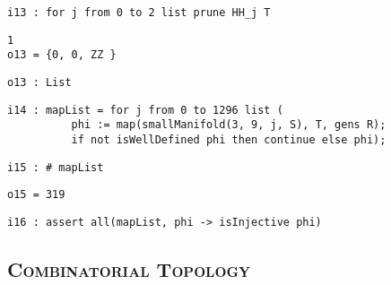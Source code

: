 \documentclass[12pt,leqno]{amsart}
\theoremstyle{definition}
\begin{document}
\begin{lstlisting}[xleftmargin=10pt, aboveskip=1.5pt, belowskip=1.5pt]
i13 : for j from 0 to 2 list prune HH_j T
\end{lstlisting}
\begin{lstlisting}[xleftmargin=10pt, lineskip=-10pt, aboveskip=4pt, belowskip=1.5pt]
               1
o13 = {0, 0, ZZ }
\end{lstlisting}
\begin{lstlisting}[xleftmargin=10pt, aboveskip=1.5pt, belowskip=1.5pt]
o13 : List
\end{lstlisting}
\begin{lstlisting}[xleftmargin=10pt, lineskip=-10pt, aboveskip=4pt, belowskip=1.5pt]
i14 : mapList = for j from 0 to 1296 list (
          phi := map(smallManifold(3, 9, j, S), T, gens R);
          if not isWellDefined phi then continue else phi);
\end{lstlisting}
\begin{lstlisting}[xleftmargin=10pt, aboveskip=1.5pt, belowskip=1.5pt]
i15 : # mapList
\end{lstlisting}
\begin{lstlisting}[xleftmargin=10pt, aboveskip=1.5pt, belowskip=1.5pt]
o15 = 319
\end{lstlisting}
\begin{lstlisting}[xleftmargin=10pt, aboveskip=1.5pt, belowskip=-5.0pt]
i16 : assert all(mapList, phi -> isInjective phi)
\end{lstlisting}


\subsection*{\scshape\mdseries Combinatorial Topology}
\end{document}

